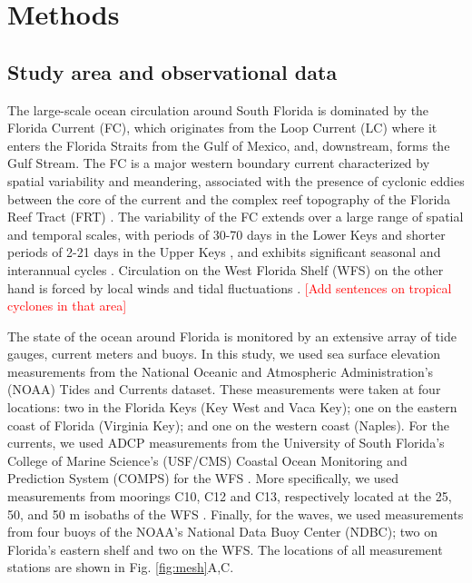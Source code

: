 \documentclass[preprint,12pt,authoryear]{elsarticle}
\begin{document}
\section{Methods}
\subsection{Study area and observational data}
The large-scale ocean circulation around South Florida is dominated by the Florida Current (FC), which originates from the Loop Current (LC) where it enters the Florida Straits from the Gulf of Mexico, and, downstream, forms the Gulf Stream. The FC is a major western boundary current characterized by spatial variability and meandering, associated with the presence of cyclonic eddies between the core of the current and the complex reef topography of the Florida Reef Tract (FRT) \citep{lee1995florida,kourafalou2012florida}.
The variability of the FC extends over a large range of spatial and temporal scales, with periods of 30-70 days in the Lower Keys \citep{lee1995florida} and shorter periods of 2-21 days in the Upper Keys \citep{lee1977low}, and exhibits significant seasonal and interannual cycles \citep{johns1987meandering, lee1988wind,schott1988variability}. Circulation on the West Florida Shelf (WFS) on the other hand is forced by local winds and tidal fluctuations \citep{lee2002volume,liu2012seasonal}. \textcolor{red}{[Add sentences on tropical cyclones in that area]}

The state of the ocean around Florida is monitored by an extensive array of tide gauges, current meters and buoys. In this study, we used sea surface elevation measurements from the National Oceanic and Atmospheric Administration’s (NOAA) Tides and Currents dataset. These measurements were taken at four locations: two in the Florida Keys (Key West and Vaca Key); one on the eastern coast of Florida (Virginia Key); and one on the western coast (Naples). For the currents, we used ADCP measurements from the University of South Florida's College of Marine Science's (USF/CMS) Coastal Ocean Monitoring and Prediction System (COMPS) for the WFS \citep{weisberg2009mean}. More specifically, we used measurements from moorings C10, C12 and C13, respectively located at the 25, 50, and 50 m isobaths of the WFS \citep{liu2020impacts}. Finally, for the waves, we used measurements from four buoys of the NOAA's National Data Buoy Center (NDBC); two on Florida's eastern shelf and two on the WFS. The locations of all measurement stations are shown in Fig. \ref{fig:mesh}A,C.
\end{document}

